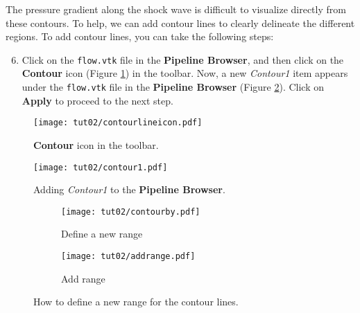 The pressure gradient along the shock wave is difficult to visualize directly from these contours. To help, we can add contour lines to clearly delineate the different regions. To add contour lines, you can take the following steps:
\begin{enumerate}[label=\arabic*)]
	\setcounter{enumi}{5}
	\item Click on the \texttt{flow.vtk} file in the \textbf{Pipeline Browser}, and then click on the \textbf{Contour} icon (Figure \ref{fig2:contour_icon}) in the toolbar. Now, a new \textit{Contour1} item appears under the \texttt{flow.vtk} file in the \textbf{Pipeline Browser} (Figure \ref{fig2:contour1}). Click on \textbf{Apply} to proceed to the next step.
\end{enumerate}
\begin{figure}[H]
    \centering
    \texttt{[image: tut02/contourlineicon.pdf]}
    \caption{\textbf{Contour} icon in the toolbar.}
    \label{fig2:contour_icon}
\end{figure}
\begin{figure}[ht]
    \centering
    \texttt{[image: tut02/contour1.pdf]}
    \caption{Adding \textit{Contour1} to the \textbf{Pipeline Browser}.}
    \label{fig2:contour1}
\end{figure}
\begin{figure}[ht]
	\centering
	\begin{subfigure}[b]{.4\textwidth}
		\centering
		\texttt{[image: tut02/contourby.pdf]}
		\caption{Define a new range}
		\label{fig2:contourby a}
	\end{subfigure}
	\hfill
	\begin{subfigure}[b]{.4\textwidth}
		\centering
		\texttt{[image: tut02/addrange.pdf]}
		\caption{Add range}
		\label{fig2:contourby b}
	\end{subfigure}     
	\caption{How to define a new range for the contour lines.}
	\label{fig2:contourby}
\end{figure}
